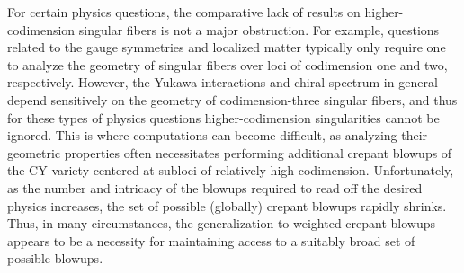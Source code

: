 \documentclass[11pt,oneside,english]{article}
\numberwithin{equation}{section}
\theoremstyle{definition}
\begin{document}
For certain physics questions, the comparative lack of results on higher-codimension singular fibers is not a major obstruction. For example, questions related to the gauge symmetries and localized matter typically only require one to analyze the geometry of singular fibers over loci of codimension one and two, respectively. However, the Yukawa interactions and chiral spectrum in general depend sensitively on the  geometry of codimension-three singular fibers, and thus for these types of physics questions higher-codimension singularities cannot be ignored. This is where computations can become difficult, as analyzing their geometric properties often necessitates performing additional crepant blowups of the CY variety centered at subloci of relatively high codimension. Unfortunately, as the number and intricacy of the blowups required to read off the desired physics increases, the set of possible (globally) crepant blowups rapidly shrinks. Thus, in many circumstances, the generalization to weighted crepant blowups appears to be a necessity for maintaining access to a suitably broad set of possible blowups. 
\end{document}
